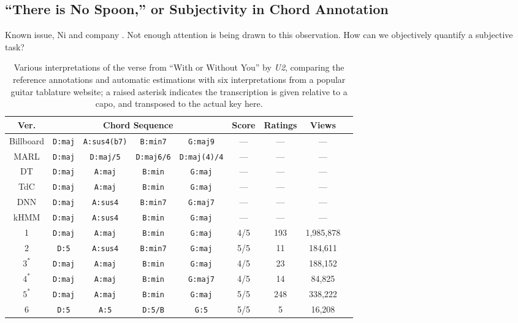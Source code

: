 \documentclass{article}
\begin{document}
\subsection{``There is No Spoon,'' or Subjectivity in Chord Annotation}

Known issue, Ni and company \cite{Ni2013Understanding}.
Not enough attention is being drawn to this observation.
How can we objectively quantify a subjective task?

\begin{table}[!t]
\small
\centering
\begin{tabular}{ c || c c c c | c c c c |}
Ver. & \multicolumn{4}{c}{Chord Sequence} & Score & Ratings & Views \\
 \hline
 Billboard & \texttt{D:maj} & \texttt{A:sus4(b7)} & \texttt{B:min7} & \texttt{G:maj9} & --- & --- & --- \\
 MARL & \texttt{D:maj} & \texttt{D:maj/5} & \texttt{D:maj6/6} & \texttt{D:maj(4)/4} & --- & --- & --- \\
 DT & \texttt{D:maj} & \texttt{A:maj} & \texttt{B:min} & \texttt{G:maj} & --- & --- & --- \\
 TdC & \texttt{D:maj} & \texttt{A:maj} & \texttt{B:min} & \texttt{G:maj} & --- & --- & --- \\
\hline
DNN & \texttt{D:maj} & \texttt{A:sus4} & \texttt{B:min7} & \texttt{G:maj7} & --- & --- & --- \\
kHMM & \texttt{D:maj} & \texttt{A:sus4} & \texttt{B:min} & \texttt{G:maj} & --- & --- & --- \\
\hline
1 & \texttt{D:maj} & \texttt{A:maj} & \texttt{B:min} & \texttt{G:maj} & 4/5 & 193 & 1,985,878 \\
2 & \texttt{D:5} & \texttt{A:sus4} & \texttt{B:min7} & \texttt{G:maj} & 5/5 & 11 & 184,611 \\
$3^*$ & \texttt{D:maj} & \texttt{A:maj} & \texttt{B:min} & \texttt{G:maj} & 4/5 & 23 & 188,152 \\
$4^*$ & \texttt{D:maj} & \texttt{A:maj} & \texttt{B:min} & \texttt{G:maj7} & 4/5 & 14 & 84,825 \\
$5^*$ & \texttt{D:maj} & \texttt{A:maj} & \texttt{B:min} & \texttt{G:maj} & 5/5 & 248 & 338,222 \\
6 & \texttt{D:5} & \texttt{A:5} & \texttt{D:5/B} & \texttt{G:5} & 5/5 & 5 & 16,208 \\
\hline
\end{tabular}
\caption{Various interpretations of the verse from ``With or Without You'' by \emph{U2}, comparing the reference annotations and automatic estimations with six interpretations from a popular guitar tablature website; a raised asterisk indicates the transcription is given relative to a capo, and transposed to the actual key here.}
\label{tab:wowu_chords}
\end{table}
\end{document}
